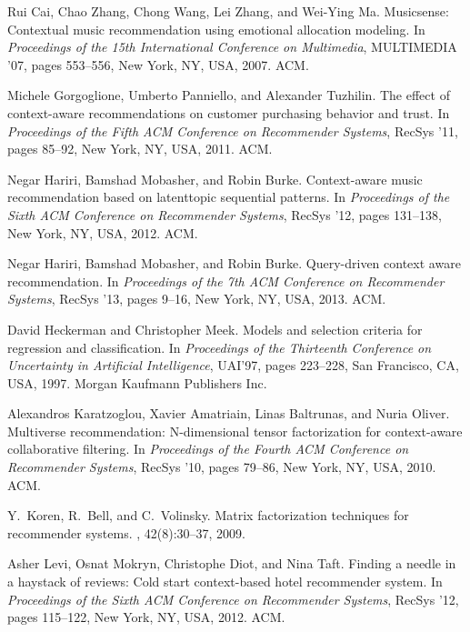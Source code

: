 \documentclass[sigconf]{acmart}
\begin{document}
\begin{thebibliography}{10}
Rui Cai, Chao Zhang, Chong Wang, Lei Zhang, and Wei-Ying Ma.
\newblock Musicsense: Contextual music recommendation using emotional
  allocation modeling.
\newblock In {\em Proceedings of the 15th International Conference on
  Multimedia}, MULTIMEDIA '07, pages 553--556, New York, NY, USA, 2007. ACM.

Michele Gorgoglione, Umberto Panniello, and Alexander Tuzhilin.
\newblock The effect of context-aware recommendations on customer purchasing
  behavior and trust.
\newblock In {\em Proceedings of the Fifth ACM Conference on Recommender
  Systems}, RecSys '11, pages 85--92, New York, NY, USA, 2011. ACM.

Negar Hariri, Bamshad Mobasher, and Robin Burke.
\newblock Context-aware music recommendation based on latenttopic sequential
  patterns.
\newblock In {\em Proceedings of the Sixth ACM Conference on Recommender
  Systems}, RecSys '12, pages 131--138, New York, NY, USA, 2012. ACM.

Negar Hariri, Bamshad Mobasher, and Robin Burke.
\newblock Query-driven context aware recommendation.
\newblock In {\em Proceedings of the 7th ACM Conference on Recommender
  Systems}, RecSys '13, pages 9--16, New York, NY, USA, 2013. ACM.

David Heckerman and Christopher Meek.
\newblock Models and selection criteria for regression and classification.
\newblock In {\em Proceedings of the Thirteenth Conference on Uncertainty in
  Artificial Intelligence}, UAI'97, pages 223--228, San Francisco, CA, USA,
  1997. Morgan Kaufmann Publishers Inc.

Alexandros Karatzoglou, Xavier Amatriain, Linas Baltrunas, and Nuria Oliver.
\newblock Multiverse recommendation: N-dimensional tensor factorization for
  context-aware collaborative filtering.
\newblock In {\em Proceedings of the Fourth ACM Conference on Recommender
  Systems}, RecSys '10, pages 79--86, New York, NY, USA, 2010. ACM.

Y.~Koren, R.~Bell, and C.~Volinsky.
\newblock Matrix factorization techniques for recommender systems.
, 42(8):30--37, 2009.

Asher Levi, Osnat Mokryn, Christophe Diot, and Nina Taft.
\newblock Finding a needle in a haystack of reviews: Cold start context-based
  hotel recommender system.
\newblock In {\em Proceedings of the Sixth ACM Conference on Recommender
  Systems}, RecSys '12, pages 115--122, New York, NY, USA, 2012. ACM.


\end{thebibliography}
\end{document}
